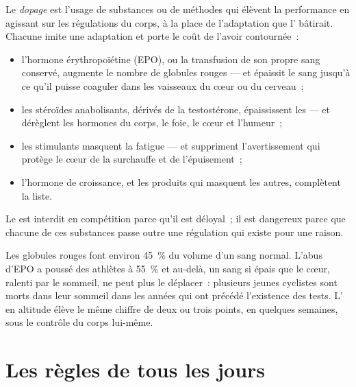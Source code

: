 \begin{proposition}[Le dopage]\label{prop:g10:sport-and-health:doping}
Le \emph{dopage} est l'usage de substances ou de méthodes
qui élèvent la performance en agissant sur les régulations du corps, à
la place de l'adaptation que l' bâtirait. Chacune imite une
adaptation et porte le coût de l'avoir contournée~:
\begin{itemize}
  \item l'hormone érythropoïétine (EPO), ou la transfusion de son
        propre sang conservé, augmente le nombre de globules rouges ---
        et épaissit le sang jusqu'à ce qu'il puisse coaguler dans les
        vaisseaux du cœur ou du cerveau~;
  \item les stéroïdes anabolisants, dérivés de la testostérone,
        épaississent les  --- et dérèglent les
        hormones du corps, le foie, le cœur et l'humeur~;
  \item les stimulants masquent la fatigue --- et suppriment
        l'avertissement qui protège le cœur de la surchauffe et de
        l'épuisement~;
  \item l'hormone de croissance, et les produits qui masquent les
        autres, complètent la liste.
\end{itemize}
Le  est interdit en compétition parce qu'il est déloyal~; il est
dangereux parce que chacune de ces substances passe outre une
régulation qui existe pour une raison.
\end{proposition}
\admitted

\begin{example}\label{ex:g10:sport-and-health:epo}
Les globules rouges font environ 45~\% du volume d'un sang normal.
L'abus d'EPO a poussé des athlètes à 55~\% et au-delà, un sang si épais
que le cœur, ralenti par le sommeil, ne peut plus le déplacer~:
plusieurs jeunes cyclistes sont morts dans leur sommeil dans les années
qui ont précédé l'existence des tests. L' en altitude élève
le même chiffre de deux ou trois points, en quelques semaines, sous le
contrôle du corps lui-même.
\end{example}

\section{Les règles de tous les jours}

